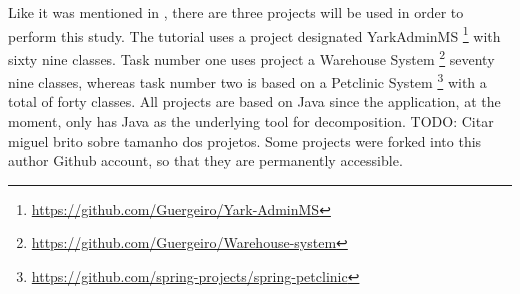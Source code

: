 Like it was mentioned in , there are three projects will be used in order to perform this study. The tutorial uses a project designated YarkAdminMS \footnote{\url{https://github.com/Guergeiro/Yark-AdminMS}} with sixty nine classes. Task number one uses project a Warehouse System \footnote{\url{https://github.com/Guergeiro/Warehouse-system}} seventy nine classes, whereas task number two is based on a Petclinic System \footnote{\url{https://github.com/spring-projects/spring-petclinic}} with a total of forty classes. All projects are based on Java since the application, at the moment, only has Java as the underlying tool for decomposition.
TODO: Citar miguel brito sobre tamanho dos projetos.
Some projects were forked into this author Github account, so that they are permanently accessible.
